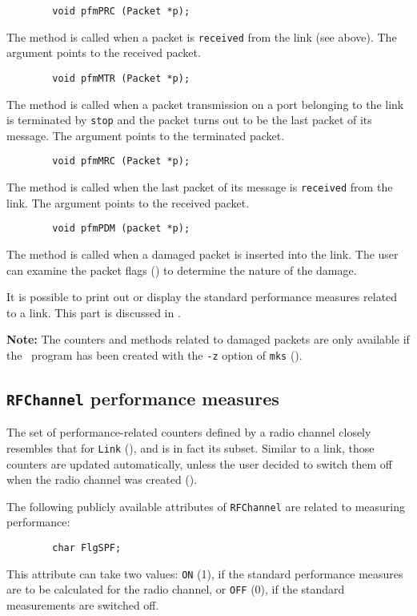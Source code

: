 \begin{verbatim}
        void pfmPRC (Packet *p);
\end{verbatim}
The method is called when a packet is {\tt received} from the link (see above).
The argument points to the received packet.

\begin{verbatim}
        void pfmMTR (Packet *p);
\end{verbatim}
The method is called when a packet transmission on a port
belonging to the link is terminated by {\tt stop} and the packet turns out to
be the last packet of its message.
The argument points to the terminated packet.

\begin{verbatim}
        void pfmMRC (Packet *p);
\end{verbatim}
The method is called when the last packet of its message
is {\tt received} from the link.
The argument points to the received packet.

\begin{verbatim}
        void pfmPDM (packet *p);
\end{verbatim}
The method is called when a damaged packet
is inserted into the link.
The user can examine the packet flags
() to determine the nature of the damage.

It is possible to print out or display
the standard performance measures related to a link.
This part is discussed in .

\medskip

\noindent
{\bf Note:} The counters and methods related to damaged packets are only
available if the \smurph\ program has been created with the {\tt -z}
option of {\tt mks} ().

\subsection{{\tt RFChannel} performance measures}
\label{rm_pm_rf}

The set of performance-related counters defined by a radio channel
closely resembles that for {\tt Link} (), and is in fact
its subset.
Similar to a link, those counters are updated automatically, unless the user
decided to switch them off when the radio channel was created
().

The following publicly available attributes of {\tt RFChannel} are related to
measuring performance:
\begin{verbatim}
        char FlgSPF;
\end{verbatim}
This attribute can take two values: {\tt ON} (1), if the standard performance
measures are to be calculated for the radio channel, or {\tt OFF} (0), if the
standard measurements are switched off.

